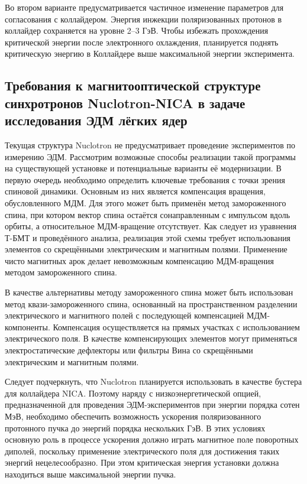 \par Во втором варианте предусматривается частичное изменение параметров для согласования с коллайдером. Энергия инжекции поляризованных протонов в коллайдер сохраняется на уровне 2–3 ГэВ. Чтобы избежать прохождения критической энергии после электронного охлаждения, планируется поднять критическую энергию в Коллайдере выше максимальной энергии эксперимента.

	\subsection{Требования к магнитооптической структуре синхротронов Nuclotron-NICA в задаче исследования ЭДМ лёгких ядер}\label{sec:EDM/requirements}

\par Текущая структура Nuclotron не предусматривает проведение экспериментов по измерению ЭДМ. Рассмотрим возможные способы реализации такой программы на существующей установке и потенциальные варианты её модернизации. В первую очередь необходимо определить ключевые требования с точки зрения спиновой динамики. Основным из них является компенсация вращения, обусловленного МДМ. Для этого может быть применён метод замороженного спина, при котором вектор спина остаётся сонаправленным с импульсом вдоль орбиты, а относительное МДМ-вращение отсутствует. Как следует из уравнения Т-БМТ и проведённого анализа, реализация этой схемы требует использования элементов со скрещёнными электрическим и магнитным полями. Применение чисто магнитных арок делает невозможным компенсацию МДМ-вращения методом замороженного спина.

\par В качестве альтернативы методу замороженного спина может быть использован метод квази-замороженного спина, основанный на пространственном разделении электрического и магнитного полей с последующей компенсацией МДМ-компоненты. Компенсация осуществляется на прямых участках с использованием электрического поля. В качестве компенсирующих элементов могут применяться электростатические дефлекторы или фильтры Вина со скрещёнными электрическим и магнитным полями.

\par Следует подчеркнуть, что Nuclotron планируется использовать в качестве бустера для коллайдера NICA. Поэтому наряду с низкоэнергетической опцией, предназначенной для проведения ЭДМ-экспериментов при энергии порядка сотен МэВ, необходимо обеспечить возможность ускорения поляризованного протонного пучка до энергий порядка нескольких ГэВ. В этих условиях основную роль в процессе ускорения должно играть магнитное поле поворотных диполей, поскольку применение электрического поля для достижения таких энергий нецелесообразно. При этом критическая энергия установки должна находиться выше максимальной энергии пучка.
	

